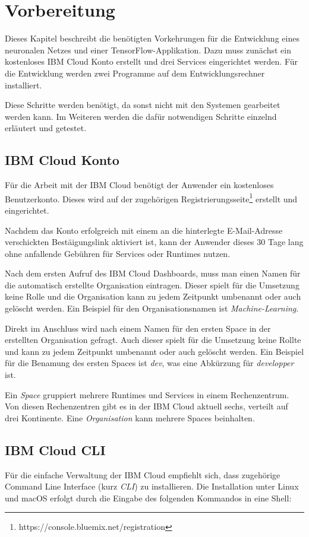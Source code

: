 \section{Vorbereitung}
Dieses Kapitel beschreibt die benötigten Vorkehrungen für die Entwicklung eines neuronalen Netzes und einer
TensorFlow-Applikation. Dazu muss zunächst ein kostenloses IBM Cloud Konto erstellt und drei Services eingerichtet
werden. Für die Entwicklung werden zwei Programme auf dem Entwicklungsrechner installiert.

Diese Schritte werden benötigt, da sonst nicht mit den Systemen gearbeitet werden kann. Im Weiteren werden die dafür
notwendigen Schritte einzelnd erläutert und getestet.

\subsection{IBM Cloud Konto}
Für die Arbeit mit der IBM Cloud benötigt der Anwender ein kostenloses Benutzerkonto. Dieses wird auf der zugehörigen
Registrierungsseite\footnote{https://console.bluemix.net/registration} erstellt und eingerichtet.

Nachdem das Konto erfolgreich mit einem an die hinterlegte E-Mail-Adresse verschickten Bestäigungslink aktiviert ist,
kann der Anwender dieses 30 Tage lang ohne anfallende Gebühren für Services oder Runtimes nutzen.

Nach dem ersten Aufruf des IBM Cloud Dashboards, muss man einen Namen für die automatisch erstellte Organisation
eintragen. Dieser spielt für die Umsetzung keine Rolle und die Organisation kann zu jedem Zeitpunkt umbenannt oder auch
gelöscht werden. Ein Beispiel für den Organisationsnamen ist \textit{Machine-Learning}.

Direkt im Anschluss wird nach einem Namen für den ersten Space in der erstellten Organisation gefragt. Auch dieser
spielt für die Umsetzung keine Rollte und kann zu jedem Zeitpunkt umbenannt oder auch gelöscht werden. Ein Beispiel für
die Benamung des ersten Spaces ist \textit{dev}, was eine Abkürzung für \textit{developper} ist.

Ein \textit{Space} gruppiert mehrere Runtimes und Services in einem Rechenzentrum. Von diesen Rechenzentren gibt es in
der IBM Cloud aktuell sechs, verteilt auf drei Kontinente. Eine \textit{Organisation} kann mehrere Spaces beinhalten.

\subsection{IBM Cloud CLI}
Für die einfache Verwaltung der IBM Cloud empfiehlt sich, dass zugehörige Command Line Interface (kurz \textit{CLI}) zu
installieren. Die Installation unter Linux und macOS erfolgt durch die Eingabe des folgenden Kommandos in eine Shell:

